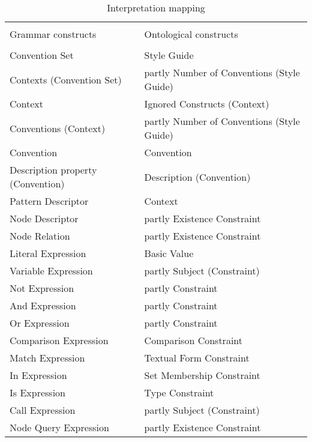 \documentclass[parskip=full]{uvamscse}
\begin{document}
\begin{center}
\begin{longtable}{ | p{20em} | p{20em} | } 
\caption{Interpretation mapping}
\label{tab:interpretation}\\
\hline
 &  \\
Grammar constructs & Ontological constructs  \\
 &  \\
\hline

Convention Set & Style Guide \\ \hline
Contexts (Convention Set) & partly Number of Conventions (Style Guide) \\ \hline
Context & Ignored Constructs (Context) \\ \hline
Conventions (Context) & partly Number of Conventions (Style Guide) \\ \hline
Convention & Convention \\ \hline
Description property (Convention) & Description (Convention) \\ \hline
Pattern Descriptor & Context \\ \hline
Node Descriptor & partly Existence Constraint \\ \hline
Node Relation & partly Existence Constraint \\ \hline

Literal Expression & Basic Value \\ \hline
Variable Expression & partly Subject (Constraint) \\ \hline
Not Expression & partly Constraint \\ \hline
And Expression & partly Constraint \\ \hline
Or Expression & partly Constraint \\ \hline
Comparison Expression & Comparison Constraint \\ \hline
Match Expression & Textual Form Constraint \\ \hline
In Expression & Set Membership Constraint \\ \hline
Is Expression & Type Constraint \\ \hline
Call Expression & partly Subject (Constraint) \\ \hline
Node Query Expression & partly Existence Constraint \\ \hline


\end{longtable}
\end{center}
\end{document}

